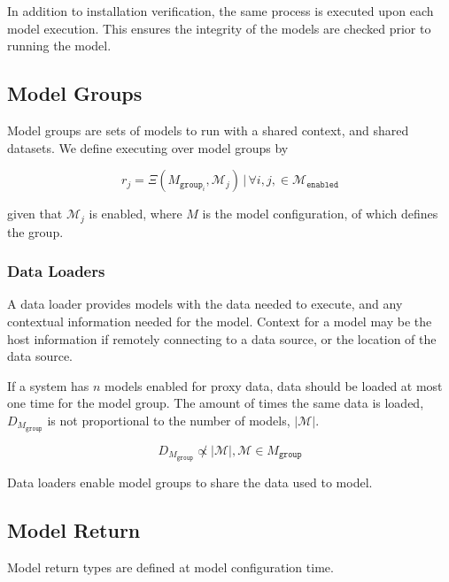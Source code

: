 \documentclass[10pt, titlepage, twocolumn]{article}
\begin{document}
In addition to installation verification, the same process is executed upon each model execution. This ensures the integrity of the models are checked prior to running the model.



\subsection{Model Groups}
Model groups are sets of models to run with a shared context, and shared datasets. We define executing over model groups by

\begin{equation}
r_j = \Xi (M_{\texttt{group}_i},  \boldsymbol{\mathcal{M}}_j) \, \vert \, \forall i,j, \in \boldsymbol{\mathcal{M}}_{\texttt{enabled}}
\end{equation}

given that \(\boldsymbol{\mathcal{M}}_j\) is enabled, where \(M\) is the model configuration, of which defines the group.

\subsubsection{Data Loaders}

A data loader provides models with the data needed to execute, and any contextual information needed for the model. Context for a model may be the host information if remotely connecting to a data source, or the location of the data source.

If a system has \(n\) models enabled for proxy data, data should be loaded at most one time for the model group. The amount of times the same data is loaded, \(D_{M_{\texttt{group}}} \) is not proportional to the number of models, \(\vert \boldsymbol{\mathcal{M}} \vert\). 

\begin{equation}
D_{M_{\texttt{group}}} \not \propto \vert \boldsymbol{\mathcal{M}} \vert , \boldsymbol{\mathcal{M}} \in M_{\texttt{group}}
\end{equation}

Data loaders enable model groups to share the data used to model.


\subsection{Model Return}

Model return types are defined at model configuration time.
\end{document}

